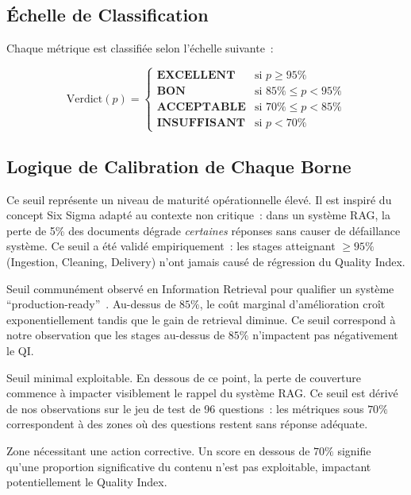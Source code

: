 \subsection{Échelle de Classification}
\label{sec:echelle_classification}

Chaque métrique est classifiée selon l'échelle suivante~:

\begin{equation}
\text{Verdict}(p) = \begin{cases}
    \textbf{EXCELLENT} & \text{si } p \geq 95\% \\
    \textbf{BON} & \text{si } 85\% \leq p < 95\% \\
    \textbf{ACCEPTABLE} & \text{si } 70\% \leq p < 85\% \\
    \textbf{INSUFFISANT} & \text{si } p < 70\%
\end{cases}
\label{eq:echelle_seuils}
\end{equation}

\subsection{Logique de Calibration de Chaque Borne}

\begin{description}[leftmargin=1cm]
  \item[$95\%$ --- EXCELLENT] Ce seuil représente un niveau de maturité opérationnelle élevé. Il est inspiré du concept Six Sigma adapté au contexte non critique~: dans un système RAG, la perte de 5\% des documents dégrade \textit{certaines} réponses sans causer de défaillance système. Ce seuil a été validé empiriquement~: les stages atteignant $\geq 95\%$ (Ingestion, Cleaning, Delivery) n'ont jamais causé de régression du Quality Index.
  
  \item[$85\%$ --- BON] Seuil communément observé en Information Retrieval pour qualifier un système ``production-ready''~\cite{manning2008ir}. Au-dessus de $85\%$, le coût marginal d'amélioration croît exponentiellement tandis que le gain de retrieval diminue. Ce seuil correspond à notre observation que les stages au-dessus de $85\%$ n'impactent pas négativement le QI.
  
  \item[$70\%$ --- ACCEPTABLE] Seuil minimal exploitable. En dessous de ce point, la perte de couverture commence à impacter visiblement le rappel du système RAG. Ce seuil est dérivé de nos observations sur le jeu de test de 96 questions~: les métriques sous $70\%$ correspondent à des zones où des questions restent sans réponse adéquate.
  
  \item[$< 70\%$ --- INSUFFISANT] Zone nécessitant une action corrective. Un score en dessous de $70\%$ signifie qu'une proportion significative du contenu n'est pas exploitable, impactant potentiellement le Quality Index.
\end{description}

